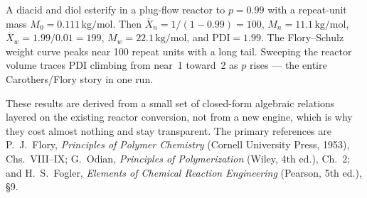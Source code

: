\documentclass[11pt,a4paper]{article}
\begin{document}
\begin{example}
A diacid and diol esterify in a plug-flow reactor to $p = 0.99$ with a
repeat-unit mass $M_0 = 0.111\,\mathrm{kg/mol}$.  Then
$\bar X_n = 1/(1-0.99) = 100$, $M_n = 11.1\,\mathrm{kg/mol}$,
$\bar X_w = 1.99/0.01 = 199$, $M_w = 22.1\,\mathrm{kg/mol}$, and
$\mathrm{PDI} = 1.99$.  The Flory--Schulz weight curve peaks near 100
repeat units with a long tail.  Sweeping the reactor volume traces
$\mathrm{PDI}$ climbing from near~1 toward~2 as $p$ rises --- the
entire Carothers/Flory story in one run.
\end{example}

These results are derived from a small set of closed-form algebraic
relations layered on the existing reactor conversion, not from a new
engine, which is why they cost almost nothing and stay transparent.
The primary references are P.~J.~Flory, \emph{Principles of Polymer
Chemistry} (Cornell University Press, 1953), Chs.~VIII--IX; G.~Odian,
\emph{Principles of Polymerization} (Wiley, 4th ed.), Ch.~2; and
H.~S.~Fogler, \emph{Elements of Chemical Reaction Engineering}
(Pearson, 5th ed.), §9.
\end{document}
